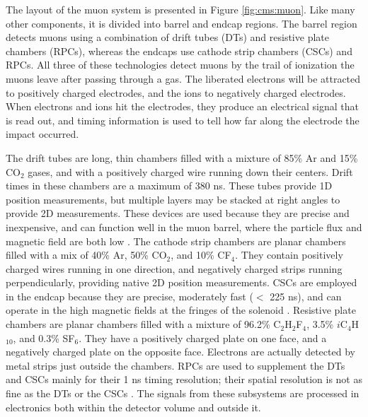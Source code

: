The layout of the muon system is presented in Figure \ref{fig:cms:muon}.
Like many other components, it is divided into barrel and endcap
regions. The barrel region detects muons using a combination of drift
tubes (DTs) and resistive plate chambers (RPCs), whereas the endcaps use cathode
strip chambers (CSCs) and RPCs. All three of these technologies detect
muons by the trail of ionization the muons leave after passing through a gas. The
liberated electrons will be attracted to positively charged
electrodes, and the ions to negatively charged electrodes. When
electrons and ions hit the electrodes, they produce an electrical
signal that is read out, and timing information
is used to tell how far along the electrode the impact occurred.

The drift tubes are long, thin chambers filled with a mixture of 85\%
Ar and 15\% CO$_2$ gases, and with a positively charged wire running
down their centers. Drift times in these chambers are a maximum of 380
ns. These tubes provide 1D position measurements, but multiple layers
may be stacked at right angles to
provide 2D measurements. These devices are used because they are precise
and inexpensive, and can function well in the muon barrel, where the
particle flux and magnetic field are both low
\cite{accelexper,websitedt}. The cathode strip chambers are planar
chambers filled with a mix of 40\% Ar, 50\% CO$_2$, and 10\%
CF$_4$. They contain positively charged wires running in
one direction, and negatively charged strips running perpendicularly,
providing native 2D position measurements. CSCs are employed in the
endcap because they are precise, moderately fast ($<$ 225 ns), and can operate
in the high magnetic fields at the fringes of the solenoid
\cite{accelexper,websitecsc}. Resistive plate chambers are planar
chambers filled with a mixture of 96.2\% C$_2$H$_2$F$_4$, 3.5\%
$i$C$_4$H$_{10}$, and 0.3\% SF$_6$. They have a positively charged
plate on one face, and a negatively charged plate on the
opposite face. Electrons are actually detected by metal strips just outside
the chambers. RPCs are used to supplement the DTs and CSCs
mainly for their 1 ns timing resolution; their spatial
resolution is not as fine as the DTs or the CSCs
\cite{accelexper,websiterpc}. The signals from these subsystems are
processed in electronics both within the detector volume and outside it.

